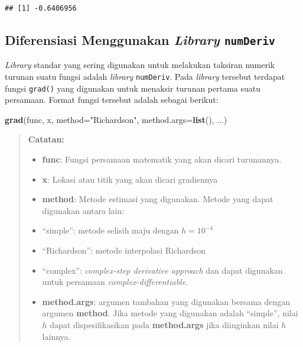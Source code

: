 \documentclass[]{book}
\newenvironment{Shaded}{\begin{snugshade}}{\end{snugshade}}
\newcommand{\DataTypeTok}[1]{\textcolor[rgb]{0.13,0.29,0.53}{#1}}
\newcommand{\KeywordTok}[1]{\textcolor[rgb]{0.13,0.29,0.53}{\textbf{#1}}}
\newcommand{\NormalTok}[1]{#1}
\newcommand{\StringTok}[1]{\textcolor[rgb]{0.31,0.60,0.02}{#1}}
\providecommand{\tightlist}{%
  \setlength{\itemsep}{0pt}\setlength{\parskip}{0pt}}
\theoremstyle{definition}
\theoremstyle{definition}
\theoremstyle{definition}
\theoremstyle{remark}
\begin{document}
\begin{verbatim}
## [1] -0.6406956
\end{verbatim}

\hypertarget{diferensiasi-menggunakan-library-numderiv}{%
\subsection{\texorpdfstring{Diferensiasi Menggunakan \emph{Library} \texttt{numDeriv}}{Diferensiasi Menggunakan Library numDeriv}}\label{diferensiasi-menggunakan-library-numderiv}}

\emph{Library} standar yang sering digunakan untuk melakukan taksiran numerik turunan suatu fungsi adalah \emph{library} \texttt{numDeriv}. Pada \emph{library} tersebut terdapat fungsi \texttt{grad()} yang digunakan untuk menaksir turunan pertama suatu persamaan. Format fungsi tersebut adalah sebagai berikut:

\begin{Shaded}
\begin{Highlighting}[]
\KeywordTok{grad}\NormalTok{(func, x, }\DataTypeTok{method=}\StringTok{"Richardson"}\NormalTok{, }\DataTypeTok{method.args=}\KeywordTok{list}\NormalTok{(), ...)}
\end{Highlighting}
\end{Shaded}

\begin{quote}
\textbf{Catatan:}

\begin{itemize}
\tightlist
\item
  \textbf{func}: Fungsi persamaan matematik yang akan dicari turunannya.
\item
  \textbf{x}: Lokasi atau titik yang akan dicari gradiennya
\item
  \textbf{method}: Metode estimasi yang digunakan. Metode yang dapat digunakan antara lain:
\item
  ``simple'': metode selisih maju dengan \(h = 10^{-4}\)
\item
  ``Richardson'': metode interpolasi Richardson
\item
  ``complex'': \emph{complex-step derivative approach} dan dapat digunakan untuk persamaan \emph{complex-differentiable}.
\item
  \textbf{method.args}: argumen tambahan yang digunakan bersama dengan argumen \textbf{method}. Jika metode yang digunakan adalah ``simple'', nilai \(h\) dapat dispesifikasikan pada \textbf{method.args} jika diinginkan nilai \(h\) lainnya.
\end{itemize}
\end{quote}
\end{document}
